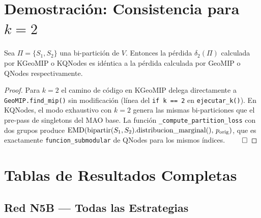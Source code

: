 \appendix

\section{Demostración: Consistencia para $k=2$}
\label{ap:consistencia}

\begin{proposition}
    Sea $\Pi = \{S_1, S_2\}$ una bi-partición de $V$. Entonces la pérdida $\delta_2(\Pi)$ calculada por KGeoMIP o KQNodes es idéntica a la pérdida calculada por GeoMIP o QNodes respectivamente.
\end{proposition}

\begin{proof}
    Para $k=2$ el camino de código en KGeoMIP delega directamente a \texttt{GeoMIP.find\_mip()} sin modificación (línea del \texttt{if k == 2} en \texttt{ejecutar\_k()}). En KQNodes, el modo exhaustivo con $k=2$ genera las mismas bi-particiones que el pre-pass de singletons del MAO base. La función \texttt{\_compute\_partition\_loss} con dos grupos produce $\operatorname{EMD}(\text{bipartir}(S_1, S_2)\text{.distribucion\_marginal()},\, p_\text{orig})$, que es exactamente \texttt{funcion\_submodular} de QNodes para los mismos índices. $\qed$
\end{proof}

\section{Tablas de Resultados Completas}
\label{ap:tablas}

\subsection{Red N5B — Todas las Estrategias}

